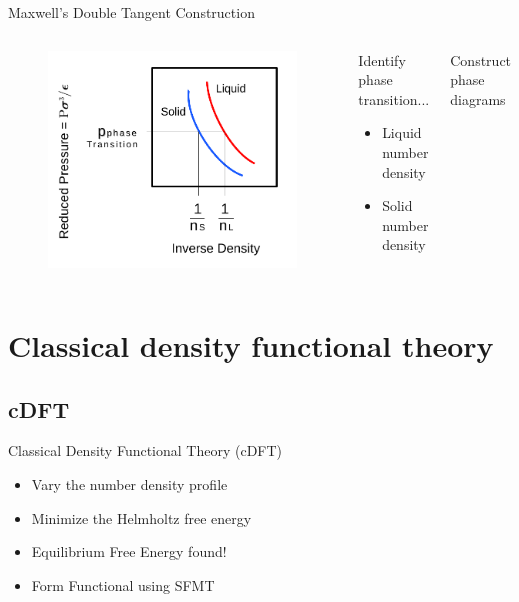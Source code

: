 \documentclass{beamer}
\begin{document}
\begin{frame}{Maxwell's Double Tangent Construction}
	\begin{columns}[t]
        \begin{figure}
            \centering
            \includegraphics[width=\columnwidth]{figs/MaxwellDTC-Fig3.pdf}
          \end{figure}
		\begin{block}{Identify phase transition...}
			\begin{itemize}
				\item Liquid number density
				\item Solid number density
			\end{itemize}
		\end{block}
		\begin{block}{Construct phase diagrams}
	    \end{block}
	\end{columns}	
\end{frame}


\section*{Classical density functional theory}
\subsection*{cDFT}
\begin{frame}{Classical Density Functional Theory (cDFT)}
    \begin{itemize}
       \item Vary the number density profile 
       \item Minimize the Helmholtz free energy
       \item Equilibrium Free Energy found!
       \item Form Functional using SFMT
     \end{itemize}
\end{frame}
\end{document}
